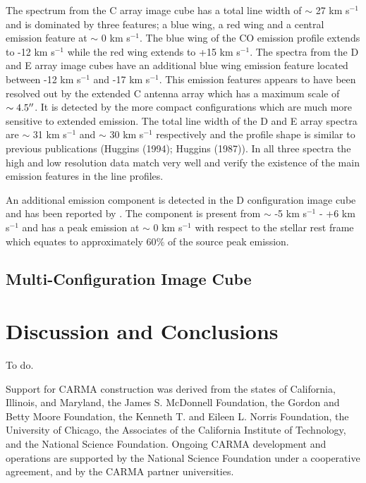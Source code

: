 \documentclass[manuscript]{aastex}
\begin{document}
The spectrum from the C array image cube has a total line width of $\sim$ 27 km s${}^{-1}$ and is dominated by three features; a blue wing, a red wing and a central emission feature at $\sim$ 0 km s${}^{-1}$. The blue wing of the CO emission profile extends to -12 km s${}^{-1}$ while the red wing extends to +15 km s${}^{-1}$. The spectra from the D and E array image cubes have an additional blue wing emission feature located between -12 km s${}^{-1}$ and -17 km s${}^{-1}$. This emission features appears to have been resolved out by the extended C antenna array which has a maximum scale of $\sim 4.5 \mbox{$^{\prime\prime}$}$. It is detected by the more compact configurations which are much more sensitive to extended emission. The total line width of the D and E array spectra are $\sim$ 31 km s${}^{-1}$ and $\sim$ 30 km s${}^{-1}$ respectively and the profile shape is similar to previous publications (Huggins (1994); Huggins (1987)). In all three spectra the high and low resolution data match very well and verify the existence of the main emission features in the line profiles.

An additional emission component is detected in the D configuration image cube and has been reported by \citet{harp09}. The component is present from $\sim$ -5 km s${}^{-1}$ - +6 km s${}^{-1}$ and has a peak emission at $\sim$ 0 km s${}^{-1}$ with respect to the stellar rest frame which equates to approximately 60$\%$ of the source peak emission.

\subsection{Multi-Configuration Image Cube} \label{results2} 



\section{Discussion and Conclusions}

To do.

\acknowledgments

Support for CARMA construction was derived from the states of California, Illinois, and
Maryland, the James S. McDonnell Foundation, the Gordon and Betty Moore Foundation, the
Kenneth T. and Eileen L. Norris Foundation, the University of Chicago, the Associates of the
California Institute of Technology, and the National Science Foundation. Ongoing CARMA
development and operations are supported by the National Science Foundation under a
cooperative agreement, and by the CARMA partner universities.
\end{document}
